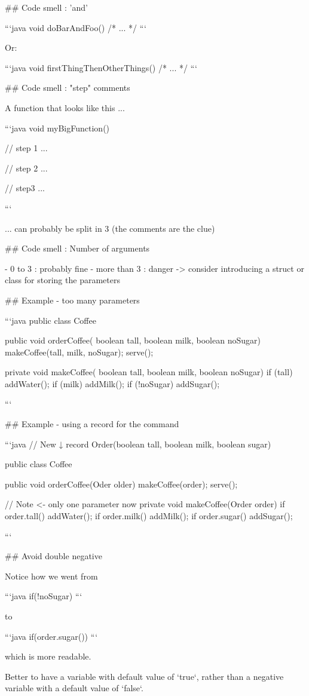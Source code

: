## Code smell : 'and'

```java
void doBarAndFoo() {
	/* ... */
}
```

Or:

```java
void firstThingThenOtherThings() {
	/* ... */
}
```

## Code smell : "step" comments

A function that looks like this ...

```java
void myBigFunction() {
    // step 1
    ...

    // step 2
    ...

    // step3
    ...
}
```

... can probably be split in 3 (the comments are the clue)

## Code smell :  Number of arguments

- 0 to 3 : probably fine
- more than 3 : danger -> consider introducing a struct or class for storing the parameters


## Example - too many parameters


```java
public class Coffee {
    public void orderCoffee(
        boolean tall, boolean milk, boolean noSugar)
    {
        makeCoffee(tall, milk, noSugar);
        serve();
    }

    private void makeCoffee(
        boolean tall, boolean milk, boolean noSugar)
    {
        if (tall)  addWater();
        if (milk) addMilk();
        if (!noSugar)  addSugar();
    }
}
```

## Example - using a record for the command

```java
// New ↓
record Order(boolean tall, boolean milk, boolean sugar) {
}

public class Coffee {
   public void orderCoffee(Oder older) {
        makeCoffee(order);
        serve();
    }

    // Note <- only one parameter now
    private void makeCoffee(Order order) {
        if order.tall() addWater();
        if order.milk() addMilk();
        if order.sugar() addSugar();
    }
}
```

## Avoid double negative

Notice how we went from

```java
if(!noSugar)
```

to

```java
if(order.sugar()) {
}
```

which is more readable.

Better to have a variable with default value of `true`,
rather than a negative variable with a default value of `false`.

